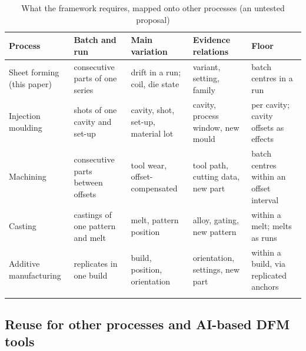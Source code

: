 \documentclass[pdflatex,sn-basic,lineno]{sn-jnl}
\newcommand{\tabsize}{\fontsize{8}{9.5}\selectfont}
\begin{document}
\begin{table}[t]
\tabsize
\setlength{\tabcolsep}{3pt}
\caption{What the framework requires, mapped onto other processes (an untested proposal)}\label{tab:processes}
\begin{tabular}{@{}L{1.9cm}L{2.4cm}L{2.5cm}L{2.7cm}L{2.7cm}@{}}
\toprule
Process & Batch and run & Main variation & Evidence relations & Floor \\
\midrule
Sheet forming (this paper) & consecutive parts of one series & drift in a run; coil, die state & variant, setting, family & batch centres in a run \\
Injection moulding & shots of one cavity and set-up & cavity, shot, set-up, material lot & cavity, process window, new mould & per cavity; cavity offsets as effects \\
Machining & consecutive parts between offsets & tool wear, offset-compensated & tool path, cutting data, new part & batch centres within an offset interval \\
Casting & castings of one pattern and melt & melt, pattern position & alloy, gating, new pattern & within a melt; melts as runs \\
Additive manufacturing & replicates in one build & build, position, orientation & orientation, settings, new part & within a build, via replicated anchors \\
\botrule
\end{tabular}
\end{table}

\subsection{Reuse for other processes and AI-based DFM tools}\label{sec:reuse}
\end{document}
